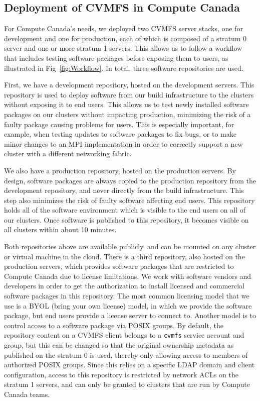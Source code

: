 \documentclass[sigconf]{acmart}
\begin{document}
\subsection{Deployment of CVMFS in Compute Canada}
\label{sub:CVMFS_in_CC}
For Compute Canada's needs, we deployed two CVMFS server stacks, one for development and one for production, each of which is composed of a stratum 0 server and one or more stratum 1 servers. This allows us to follow a workflow that includes testing software packages before exposing them to users, as illustrated in Fig~\ref{fig:Workflow}. In total, three software repositories are used.

First, we have a development repository, hosted on the development servers. This repository is used to deploy software from our build infrastructure to the clusters without exposing it to end users. This allows us to test newly installed software packages on our clusters without impacting production, minimizing the risk of a faulty package causing problems for users. This is especially important, for example, when testing updates to software packages to fix bugs, or to make minor changes to an MPI implementation in order to correctly support a new cluster with a different networking fabric. 

We also have a production repository, hosted on the production servers. By design, software packages are always copied to the production repository from the development repository, and never directly from the build infrastructure. This step also minimizes the risk of faulty software affecting end users. This repository holds all of the software environment which is visible to the end users on all of our clusters. Once software is published to this repository, it becomes visible on all clusters within about 10 minutes. 

Both repositories above are available publicly, and can be mounted on any cluster or virtual machine in the cloud. There is a third repository, also hosted on the production servers, which provides software packages that are restricted to Compute Canada due to license limitations. We work with software vendors and developers in order to get the authorization to install licensed and commercial software packages in this repository. The most common licensing model that we use is a BYOL (bring your own license) model, in which we provide the software package, but end users provide a license server to connect to. Another model is to control access to a software package via POSIX groups. By default, the repository content on a CVMFS client belongs to a \texttt{cvmfs} service account and group, but this can be changed so that the original ownership metadata as published on the stratum 0 is used, thereby only allowing access to members of authorized POSIX groups. Since this relies on a specific LDAP domain and client configuration, access to this repository is restricted by network ACLs on the stratum 1 servers, and can only be granted to clusters that are run by Compute Canada teams. 
\end{document}
